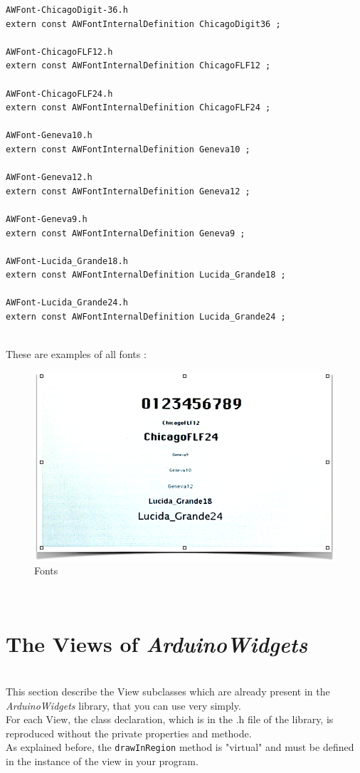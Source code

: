\documentclass[a4paper,11pt]{extarticle}
\begin{document}
\begin{lstlisting}[language=Arduinonl]
AWFont-ChicagoDigit-36.h
extern const AWFontInternalDefinition ChicagoDigit36 ;

AWFont-ChicagoFLF12.h
extern const AWFontInternalDefinition ChicagoFLF12 ;

AWFont-ChicagoFLF24.h
extern const AWFontInternalDefinition ChicagoFLF24 ;

AWFont-Geneva10.h
extern const AWFontInternalDefinition Geneva10 ;

AWFont-Geneva12.h
extern const AWFontInternalDefinition Geneva12 ;

AWFont-Geneva9.h
extern const AWFontInternalDefinition Geneva9 ;

AWFont-Lucida_Grande18.h
extern const AWFontInternalDefinition Lucida_Grande18 ;

AWFont-Lucida_Grande24.h
extern const AWFontInternalDefinition Lucida_Grande24 ;
\end{lstlisting}

~\\ These are examples of all fonts :
\begin{figure}[htbp]
   \centering
   \includegraphics[scale=0.55]{AWFig91.png} 
   \caption{Fonts}
   \label{fig:91 }
\end{figure}

~\\ 


\newpage
\section{The Views of \emph{ArduinoWidgets}}

~\\ This section describe the View subclasses which are already present in the \emph{ArduinoWidgets} library, that you can use very simply.
~\\ For each View, the class declaration, which is in the .h file of the library, is reproduced without the private properties and methode.
~\\ As explained before, the \texttt{drawInRegion} method is "virtual" and must be defined in the instance of the view in your program.
\end{document}
